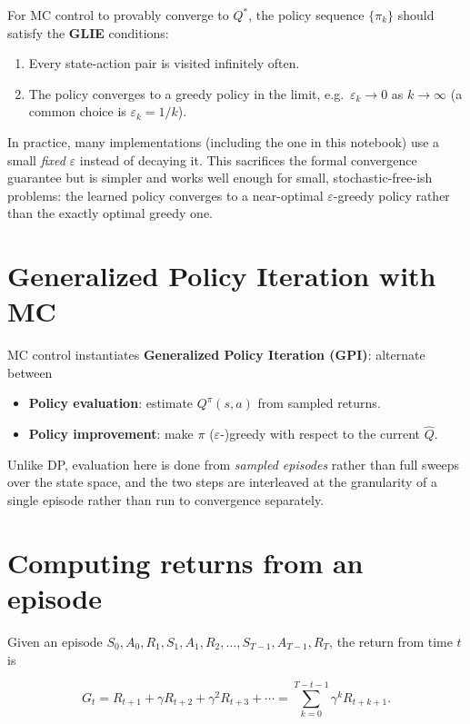 \documentclass[11pt]{article}
\begin{document}
For MC control to provably converge to $Q^*$, the policy sequence
$\{\pi_k\}$ should satisfy the \textbf{GLIE} conditions:

\begin{enumerate}[label=(\roman*)]
    \item Every state-action pair is visited infinitely often.
    \item The policy converges to a greedy policy in the limit,
        e.g.\ $\varepsilon_k \to 0$ as $k \to \infty$ (a common choice is
        $\varepsilon_k = 1/k$).
\end{enumerate}

In practice, many implementations (including the one in this notebook) use
a small \emph{fixed} $\varepsilon$ instead of decaying it. This sacrifices
the formal convergence guarantee but is simpler and works well enough for
small, stochastic-free-ish problems: the learned policy converges to a
near-optimal $\varepsilon$-greedy policy rather than the exactly optimal
greedy one.

\section{Generalized Policy Iteration with MC}

MC control instantiates \textbf{Generalized Policy Iteration (GPI)}: alternate
between

\begin{itemize}
    \item \textbf{Policy evaluation}: estimate $Q^\pi(s,a)$ from sampled
        returns.
    \item \textbf{Policy improvement}: make $\pi$ ($\varepsilon$-)greedy
        with respect to the current $\hat{Q}$.
\end{itemize}

Unlike DP, evaluation here is done from \emph{sampled episodes} rather than
full sweeps over the state space, and the two steps are interleaved at the
granularity of a single episode rather than run to convergence separately.

\section{Computing returns from an episode}

Given an episode
$S_0, A_0, R_1, S_1, A_1, R_2, \dots, S_{T-1}, A_{T-1}, R_T$,
the return from time $t$ is

\[
    G_t = R_{t+1} + \gamma R_{t+2} + \gamma^2 R_{t+3} + \cdots
        = \sum_{k=0}^{T-t-1} \gamma^k R_{t+k+1}.
\]
\end{document}
